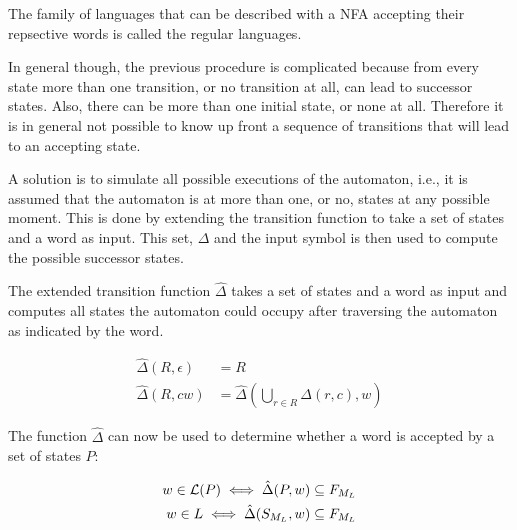 \begin{definition}
    The family of languages that can be described with a NFA
    accepting their repsective words is called the regular languages.
\end{definition}

In general though, the previous procedure is complicated because from every state more than one
transition, or no transition at all, can lead to successor states.
Also, there can be more than one initial state, or none at all.
Therefore it is in general not possible to know up front
a sequence of transitions that will lead to an accepting state.

A solution is to simulate all possible executions of the automaton, i.e.,
it is assumed that the automaton is at more than one, or no, states at any possible moment.
This is done by extending the transition function to take
a set of states and a word as input.
This set, $\Delta$ and the input symbol is then used to compute the possible successor states.

\begin{definition}
    The extended transition function $\hat\Delta$ takes a set of states and a
    word as input and computes all states the automaton could occupy
    after traversing the automaton as indicated by the word.

    \begin{align}
        \hat\Delta(R, \epsilon) &= R \\
        \hat\Delta(R, c w) &= \hat\Delta(\bigcup\limits_{r \in R} \Delta(r, c), w)
    \end{align}
\end{definition}

The function $\hat\Delta$ can now be used to determine whether
a word is accepted by a set of states $P$:

\begin{align}
    w \in \mathcal{L}(P) \iff \hat\Delta(P, w) \subseteq F_{M_L} \\
    w \in L \iff \hat\Delta(S_{M_L}, w) \subseteq F_{M_L}
\end{align}
